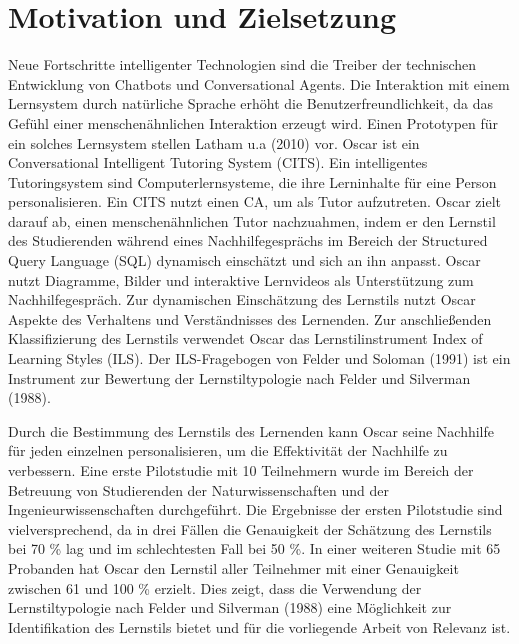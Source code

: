 \section{Motivation und Zielsetzung} \label{Forschungsmotivation}

Neue Fortschritte intelligenter Technologien sind die Treiber der technischen Entwicklung von Chatbots und Conversational Agents.
Die Interaktion mit einem Lernsystem durch natürliche Sprache erhöht die 
Benutzerfreundlichkeit, da das Gefühl einer menschenähnlichen Interaktion 
erzeugt wird. \parencite[38-42]{Folstad_Brandtzaeg.2017} 
Einen Prototypen für ein solches Lernsystem stellen
Latham u.a (2010) vor. Oscar ist ein Conversational Intelligent Tutoring System (CITS).
Ein intelligentes Tutoringsystem sind Computerlernsysteme, die ihre Lerninhalte für eine Person personalisieren.
Ein CITS nutzt einen CA, um als Tutor aufzutreten. Oscar zielt darauf ab, einen menschenähnlichen
Tutor nachzuahmen, indem er den Lernstil des Studierenden während eines Nachhilfegesprächs im Bereich der
Structured Query Language (SQL) dynamisch einschätzt und sich an ihn anpasst.
Oscar nutzt Diagramme, Bilder und interaktive Lernvideos als Unterstützung zum Nachhilfegespräch.
Zur dynamischen Einschätzung des Lernstils nutzt Oscar Aspekte des Verhaltens und Verständnisses des Lernenden.
Zur anschließenden Klassifizierung des Lernstils verwendet Oscar das Lernstilinstrument Index of Learning Styles (ILS). \parencite[1 f.]{Oscar}
Der ILS-Fragebogen von Felder und Soloman (1991) ist ein Instrument zur Bewertung der Lernstiltypologie nach Felder und Silverman (1988). \parencite[2]{Felder.2002}

Durch die Bestimmung des Lernstils des Lernenden kann Oscar seine Nachhilfe für jeden einzelnen personalisieren, um die Effektivität der Nachhilfe zu verbessern.
Eine erste Pilotstudie mit 10 Teilnehmern wurde im Bereich der Betreuung von  Studierenden der Naturwissenschaften 
und der Ingenieurwissenschaften
durchgeführt. 
Die Ergebnisse der ersten Pilotstudie sind vielversprechend, da in drei Fällen die Genauigkeit der Schätzung des Lernstils bei 70 \% lag und im schlechtesten Fall bei 50 \%. \parencite[6 f.]{Oscar}
In einer weiteren Studie mit 65 Probanden hat Oscar den Lernstil aller Teilnehmer mit einer Genauigkeit zwischen 61 und 100 \% 
erzielt. \parencite[108]{Latham.2012} Dies zeigt, dass die Verwendung der Lernstiltypologie nach Felder und Silverman (1988)  eine Möglichkeit zur 
Identifikation des Lernstils bietet und für die vorliegende Arbeit von Relevanz ist.

